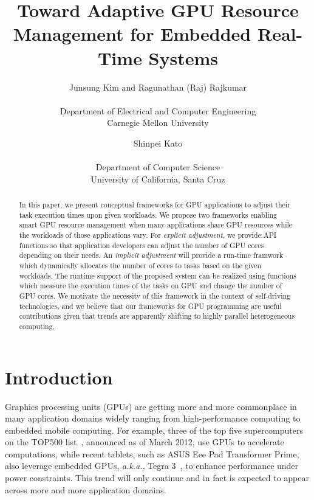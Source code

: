 \documentclass[times, 10pt, twocolumn]{article}
\begin{document}
\title{
Toward Adaptive GPU Resource Management for Embedded Real-Time Systems
}

\author {
Junsung Kim and Ragunathan (Raj) Rajkumar\\
\\
Department of Electrical and Computer Engineering\\
Carnegie Mellon University
\and
Shinpei Kato\\
\\
Department of Computer Science\\
University of California, Santa Cruz
}

\maketitle

\thispagestyle{empty}

\begin{abstract}
 In this paper, we present conceptual frameworks for GPU applications to
 adjust their task execution times upon given workloads. We propose two 
 frameworks enabling smart GPU resource management when many applications 
 share GPU resources while the workloads of those applications vary. 
 For {\it explicit adjustment}, we provide API functions so that application 
 developers can adjust the number of GPU cores depending on their needs. 
 An {\it implicit adjustment} will provide a run-time framwork which 
 dynamically allocates the number of cores to tasks based on the given 
 workloads. The runtime support of the proposed system can be realized using 
 functions which measure the execution times of the tasks on GPU and change 
 the number of GPU cores. We motivate the necessity of this framework 
 in the context of self-driving technologies, and we believe that our 
 frameworks for GPU programming are useful contributions given that 
 trends are apparently shifting to highly parallel heterogeneous computing.
\end{abstract}

\section{Introduction}
\label{sec:introduction}

Graphics processing units (GPUs) are getting more and more commonplace
in many application domains widely ranging from high-performance
computing to embedded mobile computing.
For example, three of the top five supercomputers on the TOP500
list~\cite{TOP500}, announced as of March 2012, use GPUs to accelerate
computations, while recent tablets, such as ASUS Eee Pad Transformer
Prime, also leverage embedded GPUs, \textit{a.k.a.}, Tegra
3~\cite{Tegra3}, to enhance performance under power constraints.
This trend will only continue and in fact is expected to appear across
more and more application domains.
\end{document}
